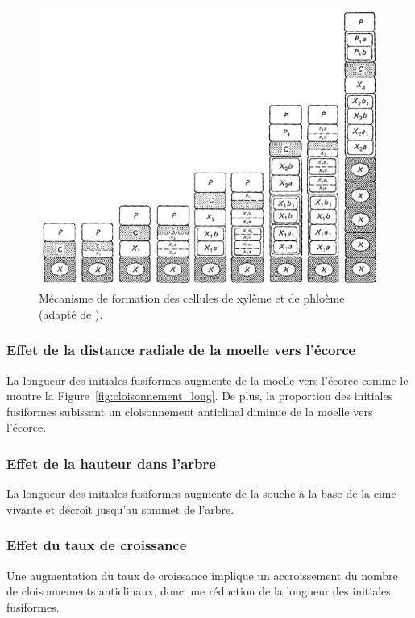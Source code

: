 \begin{figure}[h]
\centering
\includegraphics[scale=0.8]{img/ch5_develop_cambium}
\caption{Mécanisme de formation des cellules de xylème et de phloème (adapté de \cite{panshin1980textbook}).}
\label{fig:xyl_phlo_img}
\end{figure}
%
%
\subsubsection{Effet de la distance radiale de la moelle vers l'écorce}

La longueur des initiales fusiformes augmente de la moelle vers l'écorce comme le montre la Figure~\ref{fig:cloisonnement_long}. De plus, la proportion des initiales fusiformes subissant un cloisonnement anticlinal diminue de la moelle vers l'écorce.

\subsubsection{Effet de la hauteur dans l'arbre}

La longueur des initiales fusiformes augmente de la souche à la base de la cime vivante et décroît jusqu'au sommet de l'arbre.

\subsubsection{Effet du taux de croissance}\label{prt_longueur}

Une augmentation du taux de croissance implique un accroissement du nombre de cloisonnements anticlinaux, donc une réduction de la longueur des initiales fusiformes.

